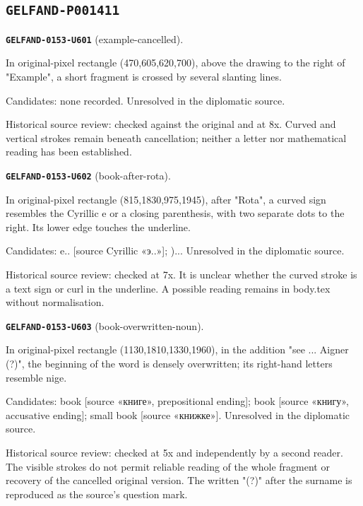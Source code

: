 \subsection*{\texttt{GELFAND-P001411}}
\par\noindent\leavevmode{}\label{GELFAND-0153-U601}\textbf{\texttt{GELFAND-0153-U601}} (example-cancelled).\nopagebreak[4]\par
In original-pixel rectangle (470,605,620,700), above the drawing to the right of "Example", a short fragment is crossed by several slanting lines.\par
Candidates: none recorded. Unresolved in the diplomatic source.\par
Historical source review: checked against the original and at 8x. Curved and vertical strokes remain beneath cancellation; neither a letter nor mathematical reading has been established.\par\medskip
\par\noindent\leavevmode{}\label{GELFAND-0153-U602}\textbf{\texttt{GELFAND-0153-U602}} (book-after-rota).\nopagebreak[4]\par
In original-pixel rectangle (815,1830,975,1945), after "Rota", a curved sign resembles the Cyrillic e or a closing parenthesis, with two separate dots to the right. Its lower edge touches the underline.\par
Candidates: e.. [source Cyrillic «э..»]; )... Unresolved in the diplomatic source.\par
Historical source review: checked at 7x. It is unclear whether the curved stroke is a text sign or curl in the underline. A possible reading remains in body.tex without normalisation.\par\medskip
\par\noindent\leavevmode{}\label{GELFAND-0153-U603}\textbf{\texttt{GELFAND-0153-U603}} (book-overwritten-noun).\nopagebreak[4]\par
In original-pixel rectangle (1130,1810,1330,1960), in the addition "see ... Aigner (?)", the beginning of the word is densely overwritten; its right-hand letters resemble nige.\par
Candidates: book [source «книге», prepositional ending]; book [source «книгу», accusative ending]; small book [source «книжке»]. Unresolved in the diplomatic source.\par
Historical source review: checked at 5x and independently by a second reader. The visible strokes do not permit reliable reading of the whole fragment or recovery of the cancelled original version. The written "(?)" after the surname is reproduced as the source's question mark.\par\medskip
